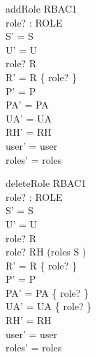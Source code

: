 \begin{zedgroup}
  \begin{schema}{addRole}
    \Delta RBAC1\\
    role? : ROLE\\
    \where
    S' = S\\
    U' = U\\
    role? \notin R\\
    R' = R \cup \{ role? \}\\
    P' = P\\
    PA' = PA\\
    UA' = UA\\
    RH' = RH\\
    user' = user\\
    roles' = roles\\
  \end{schema}
  \begin{schema}{deleteRole}
    \Delta RBAC1\\
    role? : ROLE\\
    \where
    S' = S\\
    U' = U\\
    role? \in R\\
    role? \notin RH \limg \bigcup(roles \limg S \rimg) \rimg\\
    R' = R \setminus \{ role? \}\\
    P' = P\\
    PA' = PA \nrres \{ role? \}\\
    UA' = UA \nrres \{ role? \}\\
    RH' = RH\\
    user' = user\\
    roles' = roles\\
  \end{schema}
\end{zedgroup}  


